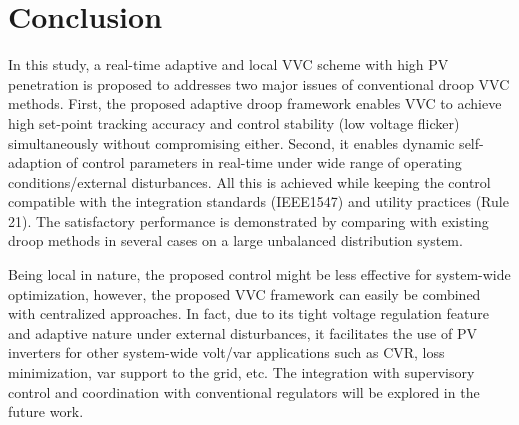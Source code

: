 \documentclass[journal]{IEEEtran}
\begin{document}
\section{Conclusion}
\vspace{-1mm}
In this study, a real-time adaptive and local VVC scheme with high PV penetration is proposed to addresses two major issues of conventional droop VVC methods. First,  the proposed adaptive droop framework enables VVC to achieve high set-point tracking accuracy and control stability (low voltage flicker) simultaneously without compromising either. Second, it enables dynamic self-adaption of control parameters in real-time 
under wide range of operating conditions/external disturbances. All this is achieved while keeping the control 
compatible with the integration standards (IEEE1547) and utility practices (Rule 21). 
The satisfactory performance is demonstrated by comparing with existing droop methods in several cases on a large unbalanced distribution system.

Being local in nature, the proposed control might be less effective for system-wide optimization, however, the proposed VVC framework can easily be combined with centralized approaches. In fact, due to its tight voltage regulation feature and adaptive nature under external disturbances, it facilitates the use of PV inverters for other system-wide volt/var applications such as CVR, loss minimization, var support to the grid, etc. The integration with supervisory control and coordination with conventional regulators will be explored in the future work.

\end{document}
